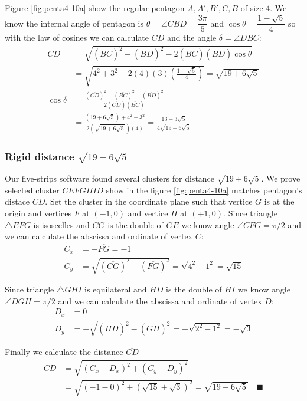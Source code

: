 \documentclass[11pt]{article}
\begin{document}
Figure \ref{fig:penta4-10a} show the regular pentagon $A,A',B',C,B$ of size $4$. We know the internal angle of pentagon is $\theta=\angle{CBD}=\dfrac{3\pi}5$ and $\cos\theta=\dfrac{1-\sqrt5}4$ so with the law of cosines we can calculate $\overline{CD}$ and the angle $\delta = \angle{DBC}$:
\begin{align}
\overline{CD} &= \sqrt{(\overline{BC})^2 + (\overline{BD})^2
 - 2(\overline{BC})(\overline{BD})\cos\theta} \nonumber\\
 &= \sqrt{4^2 + 3^2 - 2(4)(3)\left(\frac{1-\sqrt5}4\right)} = \sqrt{19+6\sqrt5}\\
%
\cos\delta &= \frac{(\overline{CD})^2 + (\overline{BC})^2 - (\overline{BD})^2}
 {2(\overline{CD})(\overline{BC})} \nonumber\\
 &= \frac{(19+6\sqrt5) + 4^2 - 3^2}{2\left(\sqrt{19+6\sqrt5}\right)(4)}
  = \frac{13 + 3\sqrt5}{4\sqrt{19+6\sqrt5}}
\end{align}

\subsubsection{Rigid distance  $\sqrt{19+6\sqrt5}$}

Our five-strips software found several clusters for distance $\sqrt{19+6\sqrt5}$. We prove selected cluster $CEFGHID$ show in the figure \ref{fig:penta4-10a} matches pentagon's distace $\overline{CD}$. Set the cluster in the coordinate plane such that vertice $G$ is at the origin and vertices $F$ at $(-1,0)$ and vertice $H$ at $(+1,0)$.
Since triangle $\triangle{EFG}$ is isoscelles and $\overline{CG}$ is the double of $\overline{GE}$ we know angle $\angle{CFG} = \pi / 2$ and we can calculate the abscissa and ordinate of vertex $C$:
\begin{align}
C_x &= -\overline{FG} = -1 \\
C_y &= \sqrt{(\overline{CG})^2 - (\overline{FG})^2} = \sqrt{4^2 - 1^2} = \sqrt{15}
\end{align}

Since triangle $\triangle{GHI}$ is equilateral and $\overline{HD}$ is the double of $\overline{HI}$ we know angle $\angle{DGH} = \pi / 2$ and we can calculate the abscissa and ordinate of vertex $D$:
\begin{align}
D_x &= 0 \\
D_y &= -\sqrt{(\overline{HD})^2 - (\overline{GH})^2} = -\sqrt{2^2 - 1^2} = -\sqrt3
\end{align}

Finally we calculate the distance $\overline{CD}$
\begin{align}
\overline{CD} &= \sqrt{(C_x - D_x)^2 + (C_y - D_y)^2} \nonumber\\
 &= \sqrt{(-1 - 0)^2 + (\sqrt{15} + \sqrt{3})^2} = \sqrt{19 + 6\sqrt5} \quad\blacksquare
\end{align}
\end{document}
